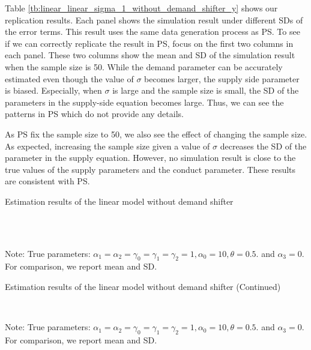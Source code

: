 \documentclass[11pt, a4paper]{article}
\begin{document}
Table \ref{tb:linear_linear_sigma_1_without_demand_shifter_y} shows our replication results.
Each panel shows the simulation result under different SDs of the error terms.
This result uses the same data generation process as PS. 
To see if we can correctly replicate the result in PS, focus on the first two columns in each panel.
These two columns show the mean and SD of the simulation result when the sample size is 50.
While the demand parameter can be accurately estimated even though the value of $\sigma$ becomes larger, the supply side parameter is biased.
Especially, when $\sigma$ is large and the sample size is small, the SD of the parameters in the supply-side equation becomes large.
Thus, we can see the patterns in PS which do not provide any details.

As PS fix the sample size to 50, we also see the effect of changing the sample size.
As expected, increasing the sample size given a value of $\sigma$ decreases the SD of the parameter in the supply equation.
However, no simulation result is close to the true values of the supply parameters and the conduct parameter.
These results are consistent with PS.

\begin{table}[!htbp]
  \begin{center}
      \caption{Estimation results of the linear model without demand shifter}
      \label{tb:linear_linear_sigma_1_without_demand_shifter_y} 
      \subfloat[$\sigma=0.001$]{}\\
      \subfloat[$\sigma=0.5$]{}\\
  \end{center}\footnotesize
  Note: True parameters: $\alpha_1 = \alpha_2 =  \gamma_0 = \gamma_1 = \gamma_2  =  1, \alpha_0 = 10, \theta = 0.5.$ and $\alpha_3 =0$. For comparison, we report mean and SD.
\end{table} 

\begin{table}[!htbp]
  \ContinuedFloat
  \begin{center}
      \caption{Estimation results of the linear model without demand shifter (Continued)}
      \subfloat[$\sigma=1.0$]{}\\
    \subfloat[$\sigma=2.0$]{}
  \end{center}\footnotesize
  Note: True parameters: $\alpha_1 = \alpha_2 =  \gamma_0 = \gamma_1 = \gamma_2  =  1, \alpha_0 = 10, \theta = 0.5.$ and $\alpha_3 =0$. For comparison, we report mean and SD.
\end{table} 
\end{document}
